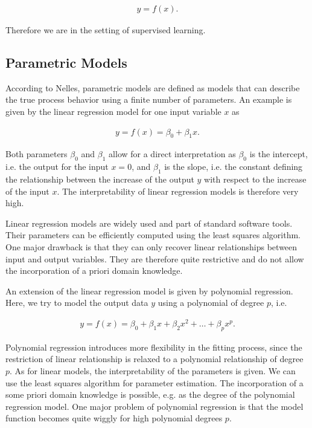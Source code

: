 \documentclass[10pt,a4paper]{article}
\begin{document}
\begin{align} \label{eq:basic-model-structure}
	y = f(x).
\end{align}

Therefore we are in the setting of supervised learning. 

\subsection{Parametric Models}

According to Nelles, parametric models are defined as models that can describe the true process behavior using a finite number of parameters.\cite{nelles2013nonlinear} An example is given by the linear regression model for one input variable $x$ as

\begin{align} \label{eq:classical-linear-model}
	y= f(x) = \beta_0 + \beta_1 x.
\end{align}

Both parameters $\beta_0$ and $\beta_1$ allow for a direct interpretation as $\beta_0$ is the intercept, i.e. the output for the input $x=0$, and $\beta_1$ is the slope, i.e. the constant defining the relationship between the increase of the output $y$ with respect to the increase of the input $x$.  The interpretability of linear regression models is therefore very high. 

Linear regression models are widely used and part of standard software tools. Their parameters can be efficiently computed using the least squares algorithm. One major drawback is that they can only recover linear relationships between input and output variables. They are therefore quite restrictive and do not allow the incorporation of a priori domain knowledge. 

An extension of the linear regression model is given by polynomial regression. Here, we try to model the output data $y$ using a polynomial of degree $p$, i.e.

\begin{align} \label{eq:polynomial-model}
	y = f(x) = \beta_0 + \beta_1 x + \beta_2 x^2 + \dots + \beta_p x^p.
\end{align}

Polynomial regression introduces more flexibility in the fitting process, since the restriction of linear relationship is relaxed to a polynomial relationship of degree $p$. As for linear models, the interpretability of the parameters is given. We can use the least squares algorithm for parameter estimation. The incorporation of a some priori domain knowledge is possible, e.g. as the degree of the polynomial regression model. One major problem of polynomial regression is that the model function becomes quite wiggly for high polynomial degrees $p$. 
\end{document}
